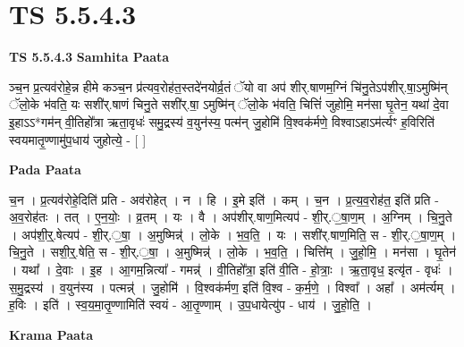 \documentclass[17pt]{extarticle}
\begin{document}
\section{ TS 5.5.4.3 }

\textbf{TS 5.5.4.3 } \newline
\textbf{Samhita Paata} \newline

ञ्च॒न प्र॒त्यव॑रोहे॒न्न हीमे कञ्च॒न प्र॑त्यव॒रोह॑त॒स्तदे॑नयोर्व्र॒तं ॅयो वा अप॑ शीर्.षाणम॒ग्निं चि॑नु॒तेऽप॑शीर्.षा॒ऽमुष्मि॑न् ॅलो॒के भ॑वति॒ यः सशी॑र्.षाणं चिनु॒ते सशी॑र्.षा॒ ऽमुष्मि॑न् ॅलो॒के भ॑वति॒ चित्तिं॑ जुहोमि॒ मन॑सा घृ॒तेन॒ यथा॑ दे॒वा इ॒हाऽऽ*गम॑न् वी॒तिहो᳚त्रा ऋता॒वृधः॑ समु॒द्रस्य॑ व॒युन॑स्य॒ पत्म॑न् जु॒होमि॑ वि॒श्वक॑र्मणे॒ विश्वाऽहाऽम॑र्त्यꣳ ह॒विरिति॑ स्वयमातृ॒ण्णामु॑प॒धाय॑ जुहोत्ये॒ - [  ] \newline

\textbf{Pada Paata} \newline

च॒न । प्र॒त्यव॑रोहे॒दिति॑ प्रति - अव॑रोहेत् । न । हि । इ॒मे इति॑ । कम् । च॒न । प्र॒त्य॒व॒रोह॑त॒ इति॑ प्रति - अ॒व॒रोह॑तः । तत् । ए॒न॒योः॒ । व्र॒तम् । यः । वै । अप॑शीर्.षाण॒मित्यप॑ - शी॒र्.॒षा॒ण॒म् । अ॒ग्निम् । चि॒नु॒ते । अप॑शी॒र्॒.षेत्यप॑ - शी॒र्.॒षा॒ । अ॒मुष्मिन्न्॑ । लो॒के । भ॒व॒ति॒ । यः । सशी॑र्.षाण॒मिति॒ स - शी॒र्.॒षा॒ण॒म् । चि॒नु॒ते । सशी॒र्॒.षेति॒ स - शी॒र्.॒षा॒ । अ॒मुष्मिन्न्॑ । लो॒के । भ॒व॒ति॒ । चित्ति᳚म् । जु॒हो॒मि॒ । मन॑सा । घृ॒तेन॑ । यथा᳚ । दे॒वाः । इ॒ह । आ॒गम॒न्नित्या᳚ - गमन्न्॑ । वी॒तिहो᳚त्रा॒ इति॑ वी॒ति - हो॒त्राः॒ । ऋ॒ता॒वृध॒ इत्यृ॑त - वृधः॑ । स॒मु॒द्रस्य॑ । व॒युन॑स्य । पत्मन्न्॑ । जु॒होमि॑ । वि॒श्वक॑र्मण॒ इति॑ वि॒श्व - क॒र्म॒णे॒ । विश्वा᳚ । अहा᳚ । अम॑र्त्यम् । ह॒विः । इति॑ । स्व॒य॒मा॒तृ॒ण्णामिति॑ स्वयं - आ॒तृ॒ण्णाम् । उ॒प॒धायेत्यु॑प - धाय॑ । जु॒हो॒ति॒ ।  \newline


\textbf{Krama Paata} \newline
\end{document}
